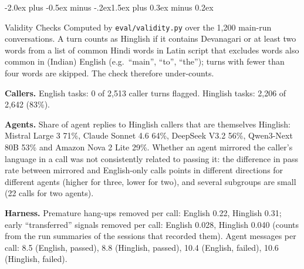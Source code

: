 \documentclass[10pt]{article}
\makeatletter
\renewcommand\section{\@startsection{section}{1}{\z@}%
  {-2.0ex plus -0.5ex minus -.2ex}{1.5ex plus 0.3ex minus 0.2ex}{\large\scshape\raggedright}}
\makeatother
\begin{document}
\section{Validity Checks}\label{app:validity}
Computed by \texttt{eval/validity.py} over the 1,200 main-run conversations. A turn counts as
Hinglish if it contains Devanagari or at least two words from a list of common Hindi words in
Latin script that excludes words also common in (Indian) English (e.g.\ ``main'', ``to'',
``the''); turns with fewer than four words are skipped. The check therefore under-counts.

\textbf{Callers.} English tasks: 0 of 2,513 caller turns flagged. Hinglish tasks: 2,206 of 2,642
(83\%).

\textbf{Agents.} Share of agent replies to Hinglish callers that are themselves Hinglish:
Mistral Large 3 71\%, Claude Sonnet 4.6 64\%, DeepSeek V3.2 56\%, Qwen3-Next 80B 53\% and Amazon
Nova 2 Lite 29\%. Whether an agent mirrored the caller's language in a call was not consistently
related to passing it: the difference in pass rate between mirrored and English-only calls points
in different directions for different agents (higher for three, lower for two), and several
subgroups are small (22 calls for two agents).

\textbf{Harness.} Premature hang-ups removed per call: English 0.22, Hinglish 0.31; early
``transferred'' signals removed per call: English 0.028, Hinglish 0.040 (counts from the run
summaries of the sessions that recorded them). Agent messages per call: 8.5 (English, passed),
8.8 (Hinglish, passed), 10.4 (English, failed), 10.6 (Hinglish, failed).
\end{document}

